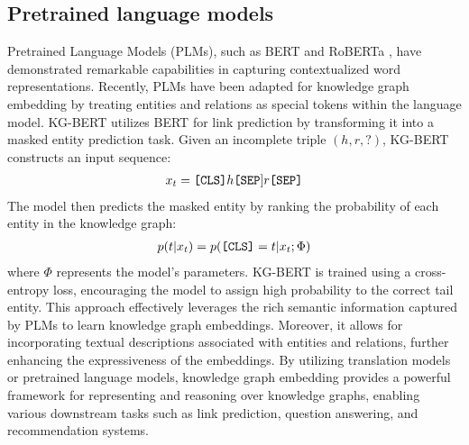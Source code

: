 \subsection{Pretrained language models}
Pretrained Language Models (PLMs), such as BERT \cite{devlin-etal-2019-bert} and RoBERTa \cite{liu2019roberta}, have demonstrated remarkable capabilities in capturing contextualized word representations. Recently, PLMs have been adapted for knowledge graph embedding by treating entities and relations as special tokens within the language model.
KG-BERT \cite{yao2019kg} utilizes BERT for link prediction by transforming it into a masked entity prediction task. Given an incomplete triple $(h, r, ?)$, KG-BERT constructs an input sequence:
\begin{align*}
x_t = \text{\texttt{[CLS]}} h \text{\texttt{[SEP}]} r \text{\texttt{[SEP]}}
\end{align*}
The model then predicts the masked entity by ranking the probability of each entity in the knowledge graph:
\begin{align}
p(t|x_t) = p(\text{\texttt{[CLS]}} = t|x_t;\Phi)
\end{align}
where $\Phi$ represents the model's parameters. KG-BERT is trained using a cross-entropy loss, encouraging the model to assign high probability to the correct tail entity.
This approach effectively leverages the rich semantic information captured by PLMs to learn knowledge graph embeddings. Moreover, it allows for incorporating textual descriptions associated with entities and relations, further enhancing the expressiveness of the embeddings.
By utilizing translation models or pretrained language models, knowledge graph embedding provides a powerful framework for representing and reasoning over knowledge graphs, enabling various downstream tasks such as link prediction, question answering, and recommendation systems.
